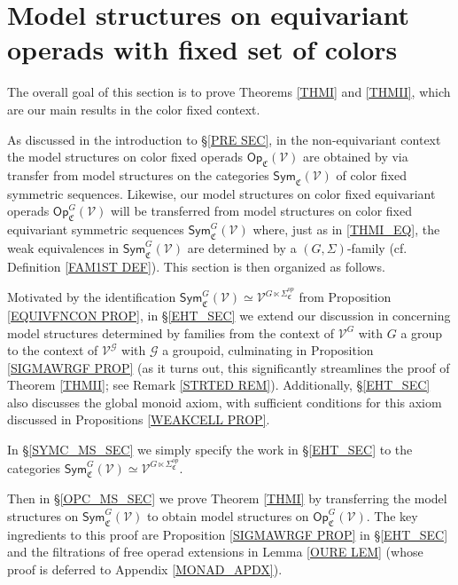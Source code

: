 \documentclass[a4paper,10pt
,draft
]{article}%
\numberwithin{equation}{section}
\numberwithin{figure}{section}
\theoremstyle{definition} %
\newcommand{\V}{\ensuremath{\mathcal V}}
\newcommand{\G}{\ensuremath{\mathcal G}}
\newcommand{\1}{\ensuremath{\mathbbm 1}}%
\begin{document}
\section{Model structures on equivariant operads with fixed set of colors}\label{FIXCOL SEC}


The overall goal of this section is to prove 
Theorems \ref{THMI} and \ref{THMII},
which are our main results in the color fixed context.

As discussed in the introduction to \S \ref{PRE SEC},
in the non-equivariant context the model structures on 
color fixed operads $\mathsf{Op}_{\mathfrak{C}}(\V)$
are obtained by via transfer from model structures on the categories
$\mathsf{Sym}_{\mathfrak{C}}(\V)$
of color fixed symmetric sequences.
Likewise, our model structures 
on color fixed equivariant operads 
$\mathsf{Op}^G_{\mathfrak{C}}(\V)$
will be transferred from model structures on 
color fixed equivariant symmetric sequences
$\mathsf{Sym}^G_{\mathfrak{C}}(\V)$
where, just as in \eqref{THMI_EQ},
the weak equivalences in 
$\mathsf{Sym}^G_{\mathfrak{C}}(\V)$
are determined by a $(G,\Sigma)$-family
(cf. Definition \ref{FAM1ST DEF}).
This section is then organized as follows.

Motivated by the identification
$\mathsf{Sym}^{G}_{\mathfrak{C}}(\V)
\simeq \V^{G \ltimes \Sigma^{op}_{\mathfrak{C}}}$
from Proposition \ref{EQUIVFNCON PROP}, 
in \S \ref{EHT_SEC}
we extend our discussion 
in \cite[\S 6]{BP_geo}
concerning model structures determined by families
from the context of $\V^G$ with $G$ a group to the context of
$\V^{\G}$ with $\G$ a groupoid,
culminating in Proposition \ref{SIGMAWRGF PROP}
(as it turns out, this significantly streamlines the proof of Theorem \ref{THMII}; see Remark \ref{STRTED REM}).
Additionally, \S \ref{EHT_SEC}
also discusses the global monoid axiom, 
with sufficient conditions for this axiom discussed in 
Propositions \ref{WEAKCELL PROP}.

In \S \ref{SYMC_MS_SEC} we simply specify
the work in \S \ref{EHT_SEC}
to the categories 
$\mathsf{Sym}^{G}_{\mathfrak{C}}(\V)
\simeq \V^{G \ltimes \Sigma^{op}_{\mathfrak{C}}}$.

Then in \S \ref{OPC_MS_SEC}
we prove Theorem \ref{THMI} by transferring the model structures on 
$\mathsf{Sym}^{G}_{\mathfrak{C}}(\V)$ to obtain model structures on
$\mathsf{Op}^{G}_{\mathfrak{C}}(\V)$.
The key ingredients to this proof are
Proposition \ref{SIGMAWRGF PROP} in \S \ref{EHT_SEC} and
the filtrations of free operad extensions 
in Lemma \ref{OURE LEM}
(whose proof is deferred to Appendix \ref{MONAD_APDX}).
\end{document}
